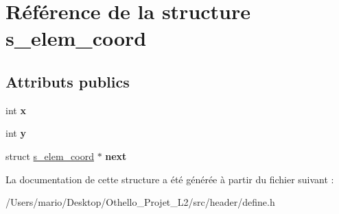 \hypertarget{structs__elem__coord}{}\section{Référence de la structure s\+\_\+elem\+\_\+coord}
\label{structs__elem__coord}
\subsection*{Attributs publics}
\begin{DoxyCompactItemize}
\item 
\mbox{\label{structs__elem__coord_a7d18beac76a18259669a03795285523a}} 
int {\bfseries x}
\item 
\mbox{\label{structs__elem__coord_a4495b868e64f0dc7e9f56c0284cad6ef}} 
int {\bfseries y}
\item 
\mbox{\label{structs__elem__coord_acb2dd144d799a664f49f9610b6a20a91}} 
struct \mbox{\hyperlink{structs__elem__coord}{s\+\_\+elem\+\_\+coord}} $\ast$ {\bfseries next}
\end{DoxyCompactItemize}


La documentation de cette structure a été générée à partir du fichier suivant \+:\begin{DoxyCompactItemize}
\item 
/\+Users/mario/\+Desktop/\+Othello\+\_\+\+Projet\+\_\+\+L2/src/header/define.\+h\end{DoxyCompactItemize}
